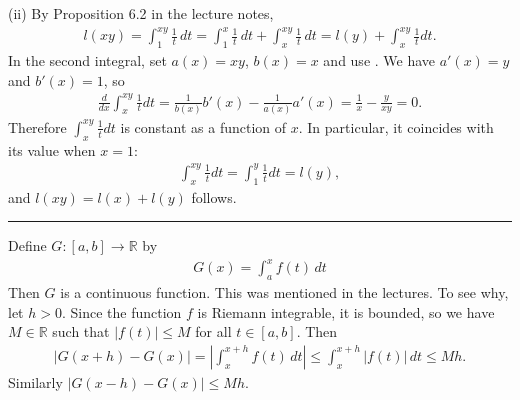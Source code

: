 \documentclass[letterpaper,10pt,english]{jupyterBook}
\begin{document}
\sphinxAtStartPar
(ii) By Proposition 6.2 in the lecture notes,
\begin{equation*}
\begin{split}
l(xy) =\int_1^{xy}\frac{1}{t}\, dt= \int_1^x \frac{1}{t}\, dt + \int_x^{xy} \frac{1}{t}\, dt = l(y) + \int_x^{xy}\frac{1}{t}dt.
\end{split}
\end{equation*}
\sphinxAtStartPar
In the second integral, set \(a(x)=xy\), \(b(x)=x\) and use {\hyperref[\detokenize{Problems:id71}]{}}. We have \(a'(x)=y\) and \(b'(x)=1\), so
\begin{equation*}
\begin{split}
\frac{d}{dx}\int_x^{xy} \frac{1}{t}dt = \frac{1}{b(x)}b'(x) - \frac{1}{a(x)}a'(x) = \frac{1}{x} - \frac{y}{xy} =0.
\end{split}
\end{equation*}
\sphinxAtStartPar
Therefore \(\int_x^{xy}\frac{1}{t}dt\) is constant as a function of \(x\). In particular, it coincides with its value when \(x=1\):
\begin{equation*}
\begin{split}
\int_x^{xy}\frac{1}{t}dt = \int_1^{y}\frac{1}{t}dt = l(y),
\end{split}
\end{equation*}
\sphinxAtStartPar
and \(l(xy)=l(x)+l(y)\) follows.


\bigskip\hrule\bigskip


\sphinxAtStartPar
{\hyperref[\detokenize{Problems:id74}]{}} Define \(G\colon [a,b]\rightarrow \mathbb{R}\) by
\begin{equation*}
\begin{split}
G(x) = \int_a^x f(t)\, dt
\end{split}
\end{equation*}
\sphinxAtStartPar
Then \(G\) is a continuous function. This was mentioned in the lectures. To see why, let \(h>0\). Since the function \(f\) is Riemann integrable, it is bounded, so we have \(M\in \mathbb{R}\) such that \(|f(t)|\leq M\) for all \(t\in [a,b]\). Then
\begin{equation*}
\begin{split}
|G(x+h) - G(x) | =\left| \int_x^{x+h} f(t)\, dt \right| \leq \int_x^{x+h} |f(t)|\, dt \leq Mh.
\end{split}
\end{equation*}
\sphinxAtStartPar
Similarly \(|G(x-h) - G(x) | \leq Mh\).
\end{document}
